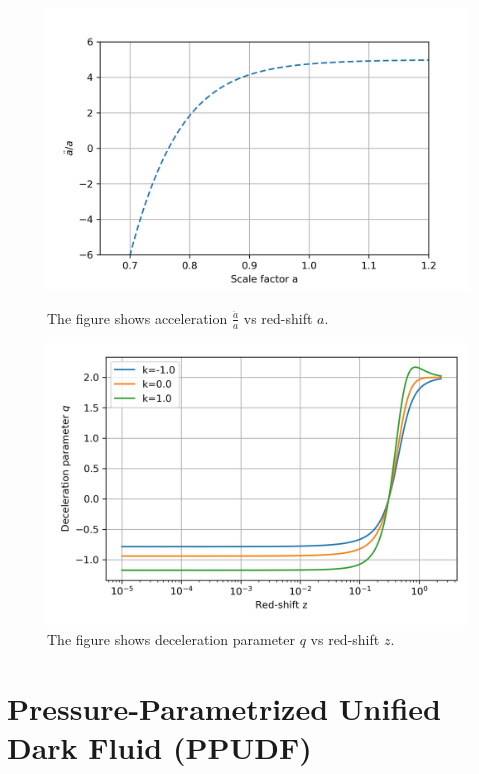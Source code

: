 \documentclass[8pt,hideothersubsections]{beamer}
\begin{document}
\begin{frame}
\begin{figure}[ht]
    \begin{minipage}{0.49\linewidth}
        \centering
        \includegraphics[width=\textwidth]{./Images/ch_ddota.jpg}
		\caption{The figure shows acceleration $\frac{\ddot{a}}{a}$ vs red-shift $a$.}
		\label{fig:ch_ddot}
    \end{minipage}
    \begin{minipage}{0.49\linewidth}
        \centering
        \includegraphics[width=\textwidth]{./Images/ch_q.jpg}
		\caption{The figure shows deceleration parameter $q$ vs red-shift $z$.}
		\label{fig:Chq}
    \end{minipage}
\end{figure}
\end{frame}

\section{Pressure-Parametrized Unified Dark Fluid (PPUDF)}
\end{document}
